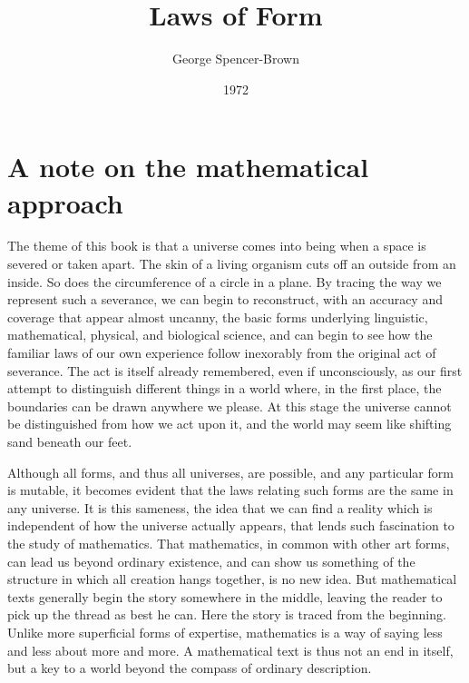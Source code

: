 \documentclass[a4paper]{article}
\title{Laws of Form}
\author{George Spencer-Brown}
\date{1972}
\theoremstyle{remark}
\begin{document}
\newpage
\maketitle

\newpage
{}
\tableofcontents

\newpage
\section*{A note on the mathematical approach}

The  theme   of  this  book  is  that  a  universe  comes  into  being  when  a  space  is  severed  or  taken  apart.  The  skin  of  a  living  organism  cuts  off  an  outside  from  an  inside.  So  does  the  circumference  of a circle in a plane. By tracing the way we represent such  a  severance,  we can  begin to  reconstruct,  with  an  accuracy  and   coverage  that   appear   almost   uncanny,   the   basic   forms   underlying   linguistic,  mathematical,   physical,   and   biological   science, and  can  begin  to  see how  the  familiar  laws  of  our  own  experience  follow  inexorably  from  the  original  act  of  severance.  The  act  is  itself  already  remembered,   even  if   unconsciously,   as  our  first  attempt  to  distinguish  different  things  in  a  world  where, in the  first  place, the boundaries  can  be drawn  anywhere  we  please.  At  this  stage  the  universe  cannot  be  distinguished  from  how  we  act upon  it,  and  the  world  may  seem  like  shifting  sand  beneath  our  feet.

Although   all  forms,   and   thus   all   universes,  are   possible,   and  any  particular  form   is  mutable,  it  becomes  evident   that   the  laws  relating  such  forms  are  the  same  in  any  universe.  It  is  this  sameness,  the  idea  that  we  can  find  a  reality  which  is  independent  of  how  the  universe  actually  appears,  that  lends  such fascination  to the study  of mathematics. That  mathematics,  in  common  with  other  art  forms,  can  lead  us  beyond  ordinary  existence, and  can  show  us  something  of the  structure  in  which  all  creation  hangs  together,  is  no  new  idea.  But  mathematical  texts generally  begin the  story  somewhere  in the  middle,  leaving  the  reader  to  pick  up  the  thread  as  best  he  can.  Here  the  story  is traced  from  the  beginning. \\

Unlike   more   superficial   forms   of   expertise,   mathematics   is  a way  of  saying  less and  less about  more  and  more.  A  mathematical  text  is  thus  not  an  end  in  itself,  but  a  key  to  a  world  beyond  the  compass  of  ordinary  description. \\ 
\end{document}
